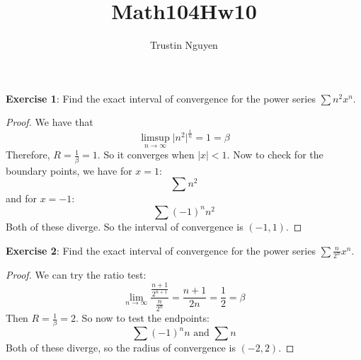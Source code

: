 \documentclass{article}
\title{Math104Hw10}
\author{Trustin Nguyen}
\begin{document}
    \maketitle

\reversemarginpar

\textbf{Exercise 1}: Find the exact interval of convergence for the power series $\sum n^{2}x^{n}$.
    \begin{proof}
        We have that 
            \begin{equation*}
                \limsup\limits_{n \to \infty} \lvert n^{2} \rvert^{\frac{1}{n}} = 1 = \beta
            \end{equation*}
        Therefore,  $R = \frac{1}{\beta} = 1$. So it converges when $ \lvert x \rvert < 1$. Now to check for the boundary points, we have for $x = 1$:
            \begin{equation*}
                \sum n^{2}
            \end{equation*}
        and for $x = -1$:
            \begin{equation*}
                \sum (-1)^{n}n^{2}
            \end{equation*}
        Both of these diverge. So the interval of convergence is $(-1, 1)$.
    \end{proof}

\textbf{Exercise 2}: Find the exact interval of convergence for the power series $\sum\frac{n}{2^{n}}x^{n}$.
    \begin{proof}
        We can try the ratio test:
            \begin{equation*}
                \lim\limits_{n \to \infty}\dfrac{\frac{n + 1}{2^{n + 1}}}{\frac{n}{2^{n}}} = \dfrac{n + 1}{2n} = \dfrac{1}{2} = \beta
            \end{equation*}
        Then $R = \frac{1}{\beta} = 2$. So now to test the endpoints:
            \begin{equation*}
                \sum (-1)^{n}n \text{ and } \sum n
            \end{equation*}
        Both of these diverge, so the radius of convergence is $(-2, 2)$.
    \end{proof}
\end{document}
